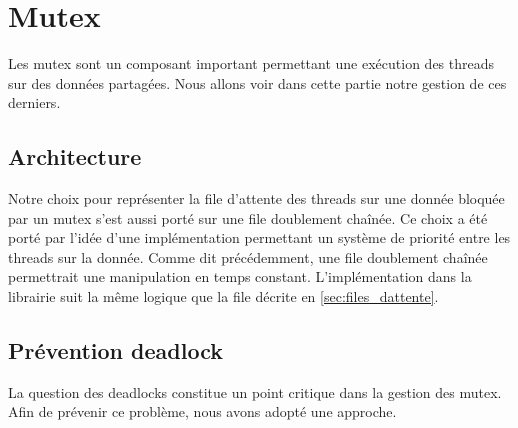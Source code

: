 \section{Mutex}
Les mutex sont un composant important permettant une exécution des threads sur des données partagées. Nous allons voir dans cette partie notre gestion de ces derniers.
\subsection{Architecture}
Notre choix pour représenter la file d'attente des threads sur une donnée bloquée par un mutex s'est aussi porté sur une file doublement chaînée.
Ce choix a été porté par l'idée d'une implémentation permettant un système de priorité entre les threads sur la donnée. Comme dit précédemment, une file doublement chaînée
permettrait une manipulation en temps constant.
L'implémentation dans la librairie suit la même logique que la file décrite en \ref{sec:files_dattente}.

\subsection{Prévention deadlock}
La question des deadlocks constitue un point critique dans la gestion des mutex. Afin de prévenir ce problème, nous avons adopté une approche.


